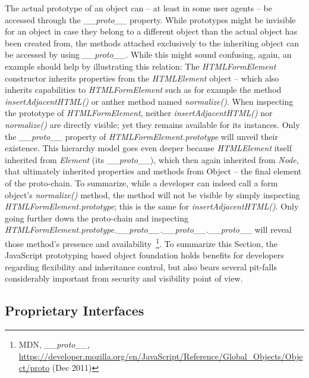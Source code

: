     The actual prototype of an object can -- at least in some user agents -- be accessed through the \textit{\_\_proto\_\_} property. While prototypes might be invisible for an object in case they belong to a different object than the actual object has been created from, the methods attached exclusively to the inheriting object can be accessed by using \textit{\_\_proto\_\_}. While this might sound confusing, again, an example should help by illustrating this relation: The \textit{HTMLFormElement} constructor inherits properties from the \textit{HTMLElement} object -- which also inherits capabilities to \textit{HTMLFormElement} such as for example the method \textit{insertAdjacentHTML()} or anther method named \textit{normalize()}. When inspecting the prototype of \textit{HTMLFormElement}, neither \textit{insertAdjacentHTML()} nor \textit{normalize()} are directly visible; yet they remains available for its instances. Only the \textit{\_\_proto\_\_} property of \textit{HTMLFormElement.prototype} will unveil their existence. This hierarchy model goes even deeper because \textit{HTMLElement} itself inherited from \textit{Element} (its \textit{\_\_proto\_\_}), which then again inherited from \textit{Node}, that ultimately inherited properties and methods from Object -- the final element of the proto-chain. To summarize, while a developer can indeed call a form object's \textit{normalize()} method, the method will not be visible by simply inspecting \textit{HTMLFormElement.prototype}; this is the same for \textit{insertAdjacentHTML()}. Only going further down the proto-chain and inspecting \textit{HTMLFormElement.prototype.\_\_proto\_\_.\_\_proto\_\_.\_\_proto\_\_} will reveal those method's presence and availability~\footnote{MDN, \textit{\_\_proto\_\_}, \url{https://developer.mozilla.org/en/JavaScript/Reference/Global_Objects/Object/proto} (Dec 2011)}. To summarize this Section, the JavaScript prototyping based object foundation holds benefits for developers regarding flexibility and inheritance control, but also bears several pit-falls considerably important from security and visibility point of view.


\subsection{Proprietary Interfaces}
    \label{subsubsec:6.2.5.proprietary_interfaces}

